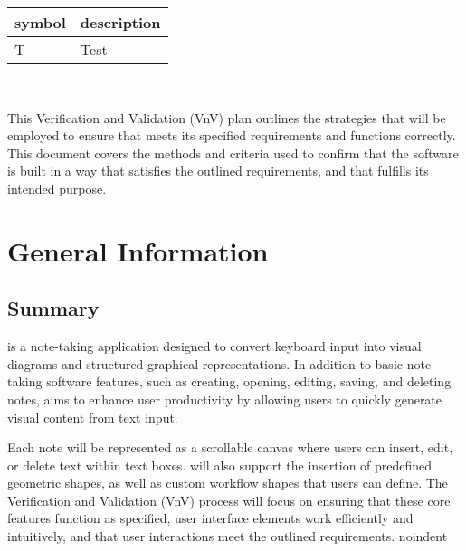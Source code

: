 \documentclass[12pt, titlepage]{article}
\begin{document}
\renewcommand{\arraystretch}{1.2}
\begin{tabular}{l l}
  \toprule
  \textbf{symbol} & \textbf{description}\\
  \midrule
  T & Test\\
  \bottomrule
\end{tabular}\\



\newpage


\noindent This Verification and Validation (VnV) plan outlines the strategies that 
will be employed to ensure that \progname{} meets its specified requirements
and functions correctly. This document covers the methods and criteria used
to confirm that the software is built in a way that satisfies the outlined
requirements, and that fulfills its intended purpose.


\section{General Information}

\subsection{Summary}


\progname{} is a note-taking application designed to convert keyboard input into
visual diagrams and structured graphical representations. In addition to basic
note-taking software features, such as creating, opening, editing, saving, and
deleting notes, \progname{} aims to enhance user productivity by allowing users
to quickly generate visual content from text input. 

\vspace{1em}

\noindent Each note will be represented as a scrollable canvas where users can insert,
edit, or delete text within text boxes. \progname{} will also support the insertion of
predefined geometric shapes, as well as custom workflow shapes that users can
define. The Verification and Validation (VnV) process will focus on ensuring
that these core features function as specified, user interface elements work
efficiently and intuitively, and that user interactions meet the outlined 
requirements.
noindent
\end{document}
